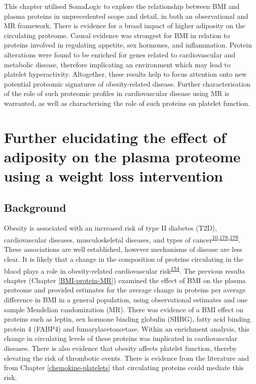 \documentclass[11pt,twoside]{bristolthesis}
\begin{document}
This chapter utilised SomaLogic to explore the relationship between BMI and plasma proteins in unprecedented scope and detail, in both an observational and MR framework. There is evidence for a broad impact of higher adiposity on the circulating proteome. Causal evidence was strongest for BMI in relation to proteins involved in regulating appetite, sex hormones, and inflammation. Protein alterations were found to be enriched for genes related to cardiovascular and metabolic disease, therefore implicating an environment which may lead to platelet hyperactivity. Altogether, these results help to focus attention onto new potential proteomic signatures of obesity-related disease. Further characterisation of the role of such proteomic profiles in cardiovascular disease using MR is warranted, as well as characterising the role of such proteins on platelet function.

\hypertarget{BMI-protein-RCT}{%
\chapter{Further elucidating the effect of adiposity on the plasma proteome using a weight loss intervention}\label{BMI-protein-RCT}}

\hypertarget{background-4}{%
\section{Background}\label{background-4}}

Obesity is associated with an increased risk of type II diabetes (T2D), cardiovascular diseases, musculoskeletal diseases, and types of cancer\textsuperscript{\protect\hyperlink{ref-Khan2018}{10},\protect\hyperlink{ref-Garg2014}{178},\protect\hyperlink{ref-Kortt2002}{179}}. These associations are well established, however mechanisms of disease are less clear. It is likely that a change in the composition of proteins circulating in the blood plays a role in obesity-related cardiovascular risk\textsuperscript{\protect\hyperlink{ref-Goudswaard2021}{154}}. The previous results chapter (Chapter \ref{BMI-protein-MR}) examined the effect of BMI on the plasma proteome and provided estimates for the average change in proteins per average difference in BMI in a general population, using observational estimates and one sample Mendelian randomization (MR). There was evidence of a BMI effect on proteins such as leptin, sex hormone binding globulin (SHBG), fatty acid binding protein 4 (FABP4) and fumarylacetoacetase. Within an enrichment analysis, this change in circulating levels of these proteins was implicated in cardiovascular diseases. There is also evidence that obesity affects platelet function, thereby elevating the risk of thrombotic events. There is evidence from the literature and from Chapter \ref{chemokine-platelets} that circulating proteins could mediate this risk.
\end{document}
